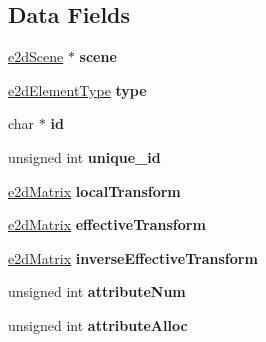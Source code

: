\subsection*{Data Fields}
\begin{DoxyCompactItemize}
\item 
\hypertarget{structe2d_element_a0ebd8fae058dd45496c86a2ca317ca9c}{\hyperlink{structe2d_scene}{e2d\-Scene} $\ast$ {\bfseries scene}}\label{structe2d_element_a0ebd8fae058dd45496c86a2ca317ca9c}

\item 
\hypertarget{structe2d_element_a7df43d7f6c23b61b843acb56eb3ca19a}{\hyperlink{group__e2d_element_ga9bc8cfdec08c7e9069fc707ee456fd38}{e2d\-Element\-Type} {\bfseries type}}\label{structe2d_element_a7df43d7f6c23b61b843acb56eb3ca19a}

\item 
\hypertarget{structe2d_element_aecb3b0d045ada529257a2fbf8f829599}{char $\ast$ {\bfseries id}}\label{structe2d_element_aecb3b0d045ada529257a2fbf8f829599}

\item 
\hypertarget{structe2d_element_a300bb6cf5b184e200523e9bce8346dc4}{unsigned int {\bfseries unique\-\_\-id}}\label{structe2d_element_a300bb6cf5b184e200523e9bce8346dc4}

\item 
\hypertarget{structe2d_element_a52bda732df714953f93c1e6f5f7c7c93}{\hyperlink{structe2d_matrix}{e2d\-Matrix} {\bfseries local\-Transform}}\label{structe2d_element_a52bda732df714953f93c1e6f5f7c7c93}

\item 
\hypertarget{structe2d_element_a6c8e26945f09b5157e2111e42f99b879}{\hyperlink{structe2d_matrix}{e2d\-Matrix} {\bfseries effective\-Transform}}\label{structe2d_element_a6c8e26945f09b5157e2111e42f99b879}

\item 
\hypertarget{structe2d_element_a5e6d7341f2dbef1923b0a3fcc13781c6}{\hyperlink{structe2d_matrix}{e2d\-Matrix} {\bfseries inverse\-Effective\-Transform}}\label{structe2d_element_a5e6d7341f2dbef1923b0a3fcc13781c6}

\item 
\hypertarget{structe2d_element_a836181401227a3ca42da026a8d35e730}{unsigned int {\bfseries attribute\-Num}}\label{structe2d_element_a836181401227a3ca42da026a8d35e730}

\item 
\hypertarget{structe2d_element_a70d94929e3789bf7c019c939b0084985}{unsigned int {\bfseries attribute\-Alloc}}\label{structe2d_element_a70d94929e3789bf7c019c939b0084985}


\end{DoxyCompactItemize}
